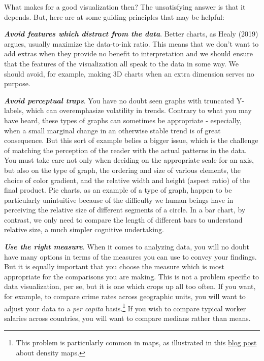 \documentclass[
  letterpaper,
]{book}
\begin{document}
What makes for a good visualization then? The unsatisfying answer is
that it depends. But, here are at some guiding principles that may be
helpful:

\textbf{\emph{Avoid features which distract from the data}}. Better
charts, as Healy (2019) argues, usually maximize the data-to-ink ratio.
This means that we don't want to add extras when they provide no benefit
to interpretation and we should ensure that the features of the
visualization all speak to the data in some way. We should avoid, for
example, making 3D charts when an extra dimension serves no purpose.

\textbf{\emph{Avoid perceptual traps}}. You have no doubt seen graphs
with truncated Y-labels, which can overemphasize volatility in trends.
Contrary to what you may have heard, these types of graphs can sometimes
be appropriate - especially, when a small marginal change in an
otherwise stable trend is of great consequence. But this sort of example
belies a bigger issue, which is the challenge of matching the perception
of the reader with the actual patterns in the data. You must take care
not only when deciding on the appropriate scale for an axis, but also on
the type of graph, the ordering and size of various elements, the choice
of color gradient, and the relative width and height (aspect ratio) of
the final product. Pie charts, as an example of a type of graph, happen
to be particularly unintuitive because of the difficulty we human beings
have in perceiving the relative size of different segments of a circle.
In a bar chart, by contrast, we only need to compare the length of
different bars to understand relative size, a much simpler cognitive
undertaking.

\textbf{\emph{Use the right measure}}. When it comes to analyzing data,
you will no doubt have many options in terms of the measures you can use
to convey your findings. But it is equally important that you choose the
measure which is most appropriate for the comparisons you are making.
This is not a problem specific to data visualization, per se, but it is
one which crops up all too often. If you want, for example, to compare
crime rates across geographic units, you will want to adjust your data
to a \emph{per capita} basis.\footnote{This problem is particularly
  common in maps, as illustrated in this
  \href{https://kieranhealy.org/blog/archives/2015/06/12/americas-ur-choropleths/}{blog
  post} about density maps.} If you wish to compare typical worker
salaries across countries, you will want to compare medians rather than
means.
\end{document}

